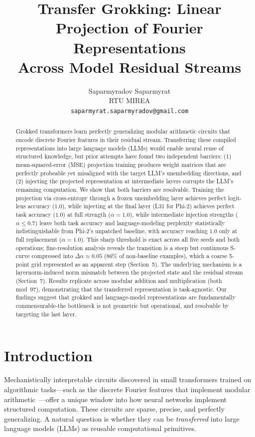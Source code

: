 \documentclass{article}
\title{Transfer Grokking: Linear Projection of Fourier Representations\\
        Across Model Residual Streams}
\author{%
  Saparmyradov Saparmyrat \\
  RTU MIREA \\
  \texttt{saparmyrat.saparmyradov@gmail.com}%
}
\begin{document}
\maketitle

\begin{abstract}
  Grokked transformers learn perfectly generalizing modular arithmetic circuits
  that encode discrete Fourier features in their residual stream.
  Transferring these compiled representations into large language models (LLMs)
  would enable neural reuse of structured knowledge, but prior attempts have
  found two independent barriers: (1) mean-squared-error (MSE) projection
  training produces weight matrices that are perfectly probeable yet misaligned
  with the target LLM's unembedding directions, and (2) injecting the projected
  representation at intermediate layers corrupts the LLM's remaining computation.
  We show that both barriers are resolvable.
  Training the projection via cross-entropy through a frozen unembedding layer
  achieves perfect logit-lens accuracy ($1.0$), while injecting at the final
  layer (L31 for Phi-2) achieves perfect task accuracy ($1.0$) at full strength
  ($\alpha = 1.0$), while intermediate injection strengths ($\alpha \leq 0.7$)
  leave both task accuracy and language-modeling perplexity statistically
  indistinguishable from Phi-2's unpatched baseline, with accuracy reaching
  $1.0$ only at full replacement ($\alpha = 1.0$).  This sharp threshold is
  exact across all five seeds and both operations; fine-resolution analysis
  reveals the transition is a steep but continuous S-curve compressed into
  $\Delta\alpha \approx 0.05$ (86\% of non-baseline examples), which a
  coarse 5-point grid represented as an apparent step (Section~5).  The
  underlying mechanism is a layernorm-induced norm mismatch
  between the projected state and the residual stream (Section~7).
  Results replicate across modular addition and multiplication (both mod~97),
  demonstrating that the transferred representation is task-agnostic.
  Our findings suggest that grokked and language-model representations are
  fundamentally commensurable{\;-\;}the bottleneck is not geometric but
  operational, and resolvable by targeting the last layer.
\end{abstract}

\section{Introduction}
\label{sec:intro}

Mechanistically interpretable circuits discovered in small transformers
trained on algorithmic tasks---such as the discrete Fourier features that
implement modular arithmetic~\cite{nanda2023progress,chughtai2023summing}---offer
a unique window into how neural networks implement structured computation.
These circuits are sparse, precise, and perfectly generalizing.  A natural
question is whether they can be \emph{transferred} into large language models
(LLMs) as reusable computational primitives.
\end{document}
